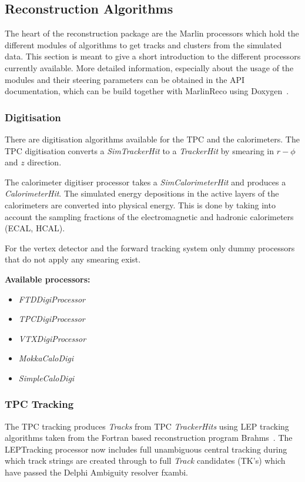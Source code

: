 \subsection{Reconstruction Algorithms}

The heart of the reconstruction package are the Marlin processors
which hold the different modules of algorithms to get tracks and
clusters from the simulated data. This section is meant to give a short
introduction to the different processors currently available. More detailed
information, especially about the usage of the modules and their
steering parameters can be obtained in the API documentation, which can be
build together with MarlinReco using Doxygen~\cite{ref_doxygen}.

\subsubsection{Digitisation}

There are digitisation algorithms available for the TPC and the
calorimeters.
The TPC digitisation converts a
{\em SimTrackerHit} to a {\em TrackerHit} by smearing in $r-\phi$ and $z$
direction.

The calorimeter digitiser processor
takes a {\em SimCalorimeterHit} and produces a {\em CalorimeterHit}.
The simulated energy depositions in the active
layers of the calorimeters are converted into physical energy.
This is done by taking into account the sampling fractions of
the electromagnetic and hadronic calorimeters (ECAL, HCAL).

For the vertex detector and
the forward tracking system only dummy processors that do not apply any
smearing exist.

{\bf Available processors:}
\begin{itemize}
\item {\em FTDDigiProcessor}
\item {\em TPCDigiProcessor}
\item {\em VTXDigiProcessor}
\item {\em MokkaCaloDigi}
\item {\em SimpleCaloDigi}
\end{itemize}

\subsubsection{TPC Tracking}

The TPC tracking produces {\em Tracks} from TPC {\em TrackerHits} using LEP
tracking algorithms taken from the Fortran based reconstruction program
Brahms~\cite{ref_brahms}.
The LEPTracking processor now includes full unambiguous central tracking during
which track strings are created through to full {\em Track} candidates (TK's)
which have passed the Delphi Ambiguity resolver fxambi.

